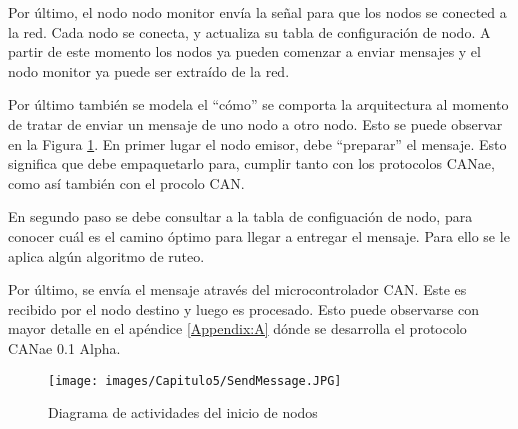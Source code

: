 Por último,  el nodo nodo monitor envía la señal para que los nodos se conected a
la red. Cada nodo se conecta, y actualiza su tabla de configuración de nodo. A partir
de este momento los nodos ya pueden comenzar a enviar mensajes y el nodo monitor ya
puede ser extraído de la red. 

Por último también se modela el ``cómo'' se comporta la arquitectura al
momento de tratar de enviar un mensaje de uno nodo a otro nodo. Esto se puede
observar en la Figura \ref{fig:SendMessage}. En primer lugar el nodo emisor,
debe ``preparar'' el mensaje. Esto significa que debe empaquetarlo para,
cumplir tanto con los protocolos CANae, como así también con el procolo CAN.

En segundo paso se debe consultar a la tabla de configuación de nodo, para conocer
cuál es el camino óptimo para llegar a entregar el mensaje. Para ello se le aplica algún
algoritmo de ruteo.

Por último, se envía el mensaje através del microcontrolador CAN. Este es recibido por el nodo
destino y luego es procesado. Esto puede observarse con mayor detalle en el
apéndice \ref{Appendix:A} dónde se desarrolla el protocolo CANae 0.1 Alpha. 

\begin{figure}[h!]
 \centering
 \texttt{[image: images/Capitulo5/SendMessage.JPG]}
  \caption{Diagrama de actividades del inicio de nodos}
  \label{fig:SendMessage}
\end{figure}
